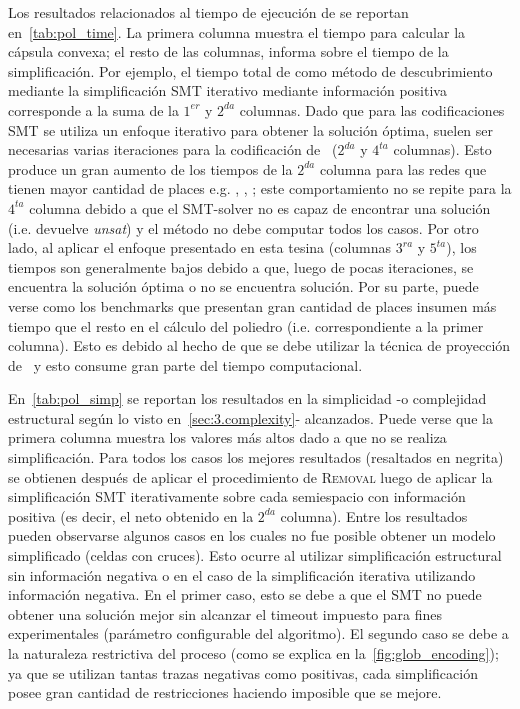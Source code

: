 Los resultados relacionados al tiempo de ejecución de \pachtool se reportan en~\autoref{tab:pol_time}.
La primera columna muestra el tiempo para calcular la cápsula convexa; el resto de las columnas, informa
sobre el tiempo de la simplificación. Por ejemplo, el tiempo total de \pachtool como método de descubrimiento
mediante la simplificación SMT iterativo mediante información positiva corresponde a la suma de la $1^{er}$ y $2^{da}$ columnas.
Dado que para las codificaciones SMT se utiliza un enfoque iterativo para obtener la solución óptima,
suelen ser necesarias varias iteraciones para la codificación de~\cite{LeonCB15} ($2^{da}$ y $4^{ta}$ columnas). 
Esto produce un gran aumento de los tiempos de la $2^{da}$ columna para las redes que tienen mayor cantidad de places
e.g. , , ; este comportamiento no se repite para la $4^{ta}$ columna
debido a que el SMT-solver no es capaz de encontrar una solución (i.e. devuelve \emph{unsat}) y el método no debe computar todos los casos.
Por otro lado, al aplicar el enfoque presentado en esta tesina (columnas $3^{ra}$ y $5^{ta}$), los tiempos son 
generalmente bajos debido a que, luego de pocas iteraciones, se encuentra la solución óptima o no se encuentra solución.
Por su parte, puede verse como los benchmarks que presentan gran cantidad de places insumen más tiempo que el resto
en el cálculo del poliedro (i.e. correspondiente a la primer columna). Esto es debido al hecho de que se debe
utilizar la técnica de proyección de~\cite{CarmonaC14} y esto consume gran parte del tiempo computacional.




En~\autoref{tab:pol_simp} se reportan los resultados en la simplicidad -o complejidad estructural
según lo visto en~\autoref{sec:3.complexity}- alcanzados. 
Puede verse que la primera columna muestra los valores más altos dado a que no se realiza simplificación.
Para todos los casos los mejores resultados (resaltados en negrita) se obtienen después de aplicar el 
procedimiento de \textsc{Removal} luego de aplicar la simplificación SMT iterativamente sobre cada semiespacio
con información positiva (es decir, el neto obtenido en la $2^{da}$ columna). 
Entre los resultados pueden observarse algunos casos en los cuales no fue posible obtener
un modelo simplificado (celdas con cruces). Esto ocurre al utilizar simplificación estructural 
sin información negativa o en el caso de la simplificación iterativa utilizando información negativa.
En el primer caso, esto se debe a que el SMT no puede obtener una solución mejor sin alcanzar el timeout impuesto
para fines experimentales (parámetro configurable del algoritmo). El segundo caso se debe a la naturaleza restrictiva
del proceso (como se explica en la~\autoref{fig:glob_encoding}); ya que se utilizan tantas trazas negativas como positivas,
cada simplificación posee gran cantidad de restricciones haciendo imposible que se mejore.


